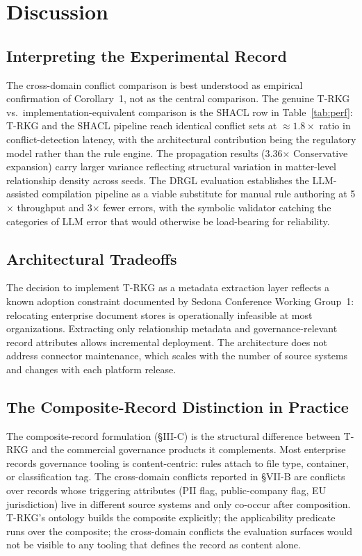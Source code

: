 \documentclass{ieeeaccess}
\begin{document}
\section{Discussion}

\subsection{Interpreting the Experimental Record}

The cross-domain conflict comparison is best understood as empirical confirmation of Corollary~1, not as the central comparison. The genuine T-RKG vs.\ implementation-equivalent comparison is the SHACL row in Table~\ref{tab:perf}: T-RKG and the SHACL pipeline reach identical conflict sets at $\approx 1.8\times$ ratio in conflict-detection latency, with the architectural contribution being the regulatory model rather than the rule engine. The propagation results (3.36$\times$ Conservative expansion) carry larger variance reflecting structural variation in matter-level relationship density across seeds. The DRGL evaluation establishes the LLM-assisted compilation pipeline as a viable substitute for manual rule authoring at 5$\times$ throughput and 3$\times$ fewer errors, with the symbolic validator catching the categories of LLM error that would otherwise be load-bearing for reliability.

\subsection{Architectural Tradeoffs}

The decision to implement T-RKG as a metadata extraction layer reflects a known adoption constraint documented by Sedona Conference Working Group~1: relocating enterprise document stores is operationally infeasible at most organizations. Extracting only relationship metadata and governance-relevant record attributes allows incremental deployment. The architecture does not address connector maintenance, which scales with the number of source systems and changes with each platform release.

\subsection{The Composite-Record Distinction in Practice}

The composite-record formulation (§III-C) is the structural difference between T-RKG and the commercial governance products it complements. Most enterprise records governance tooling is content-centric: rules attach to file type, container, or classification tag. The cross-domain conflicts reported in §VII-B are conflicts over records whose triggering attributes (PII flag, public-company flag, EU jurisdiction) live in different source systems and only co-occur after composition. T-RKG's ontology builds the composite explicitly; the applicability predicate runs over the composite; the cross-domain conflicts the evaluation surfaces would not be visible to any tooling that defines the record as content alone.
\end{document}
